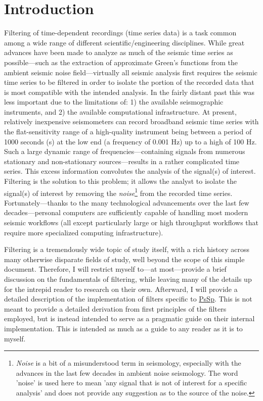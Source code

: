 \documentclass[american, twoside]{article}
\begin{document}
\section{Introduction} \label{Introduction}
Filtering of time-dependent recordings (time series data) is a task common among a wide range of different scientific/engineering disciplines.
While great advances have been made to analyze as much of the seismic time series as possible---such as the extraction of approximate
Green's functions from the ambient seismic noise field---virtually all seismic analysis first requires the seismic time series to
be filtered in order to isolate the portion of the recorded data that is most compatible with the intended analysis. In the fairly
distant past this was less important due to the limitations of: 1) the available seismographic instruments, and 2) the available
computational infrastructure. At present, relatively inexpensive seismometers can record broadband seismic time series with the flat-sensitivity
range of a high-quality instrument being between a period of 1000 seconds (s) at the low end (a frequency of 0.001 Hz) up to a high
of 100 Hz. Such a large dynamic range of frequencies---containing signals from numerous stationary and non-stationary sources---results in a
rather complicated time series. This excess information convolutes the analysis of the signal(s) of interest.
Filtering is the solution to this problem; it allows the analyst to isolate the signal(s) of interest by removing the \textit{noise}\footnote{\textit{Noise} is a bit of a misunderstood term in
seismology, especially with the advances in the last few decades in ambient noise seismology. The word 'noise' is used here to mean 'any
signal that is not of interest for a specific analysis' and does not provide any suggestion as to the source of the noise.} from the
recorded time series. Fortunately---thanks to the many technological advancements over the last few decades---personal computers are sufficiently
capable of handling most modern seismic workflows (all except particularly large or high throughput workflows that require more specialized
computing infrastructure).

Filtering is a tremendously wide topic of study itself, with a rich history across many otherwise disparate fields of study, well
beyond the scope of this simple document. Therefore, I will restrict myself to---at most---provide a brief discussion
on the fundamentals of filtering, while leaving many of the details up for the intrepid reader to research on their own. Afterward,
I will provide a detailed description of the implementation of filters specific to \href{https://github.com/arbCoding/PsSp}{PsSp}.
This is not meant to provide a detailed derivation from first principles of the filters employed, but is instead intended to serve as
a pragmatic guide on their internal implementation. This is intended as much as a guide to any reader as it is to myself.
\end{document}

